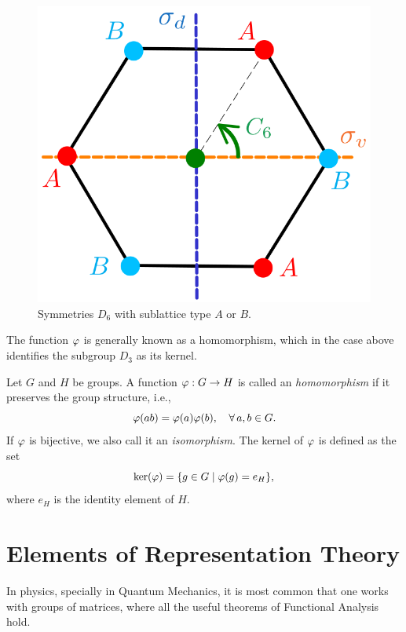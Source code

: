 \begin{figure}[H]
\centering
\includegraphics[width=0.4\linewidth]{fig/hexagon_AB.png}
\caption{Symmetries $D_6$ with sublattice type $A$ or $B$.}
\label{fig:hexagon_AB}
\end{figure}



The function $\varphi$ is generally known as a homomorphism, which in the case above identifies the subgroup $D_3$ as its kernel.

\begin{definition}
Let $G$ and $H$ be groups. A function $\varphi: G \to H$ is called an \textit{homomorphism} if it preserves the group structure, i.e.,
\begin{equation} \label{eq:homomorphism}
\varphi(a b) = \varphi(a) \varphi(b), \quad \forall \, a,b \in G.
\end{equation}
If $\varphi$ is bijective, we also call it an \textit{isomorphism}. The kernel of $\varphi$ is defined as the set
$$
\ker(\varphi) = \qty{g \in G \mid \varphi(g) = e_H},
$$
where $e_H$ is the identity element of $H$.
\end{definition}

\section{Elements of Representation Theory}

In physics, specially in Quantum Mechanics, it is most common that one works with groups of matrices, where all the useful theorems of Functional Analysis hold.

